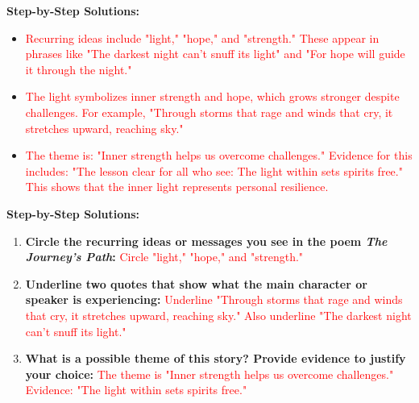 \documentclass[12pt]{article}
\begin{document}
\begin{tcolorbox}[colframe=black!60, colback=white, 
coltitle=black, colbacktitle=black!15, fonttitle=\bfseries\Large, 
title=\textit{The Light Within}, halign title=center, left=10pt, right=10pt, top=10pt, bottom=15pt]

\textbf{Step-by-Step Solutions:}
\begin{itemize}
    \item \textcolor{red}{Recurring ideas include "light," "hope," and "strength." These appear in phrases like "The darkest night can't snuff its light" and "For hope will guide it through the night."}
    \item \textcolor{red}{The light symbolizes inner strength and hope, which grows stronger despite challenges. For example, "Through storms that rage and winds that cry, it stretches upward, reaching sky."}
    \item \textcolor{red}{The theme is: "Inner strength helps us overcome challenges." Evidence for this includes: "The lesson clear for all who see: The light within sets spirits free." This shows that the inner light represents personal resilience.}
\end{itemize}

\end{tcolorbox}

\vspace{1em}

\begin{tcolorbox}[colframe=black!60, colback=white, 
coltitle=black, colbacktitle=black!15, fonttitle=\bfseries\Large, 
title=Guided Practice, halign title=center, left=10pt, right=10pt, top=10pt, bottom=15pt]

\textbf{Step-by-Step Solutions:}
\begin{enumerate}[itemsep=1em]
    \item \textbf{Circle the recurring ideas or messages you see in the poem \textit{The Journey's Path}:} \textcolor{red}{Circle "light," "hope," and "strength."}
    \item \textbf{Underline two quotes that show what the main character or speaker is experiencing:} \textcolor{red}{Underline "Through storms that rage and winds that cry, it stretches upward, reaching sky." Also underline "The darkest night can't snuff its light."}
    \item \textbf{What is a possible theme of this story? Provide evidence to justify your choice:} \textcolor{red}{The theme is "Inner strength helps us overcome challenges." Evidence: "The light within sets spirits free."}
\end{enumerate}

\end{tcolorbox}
\end{document}
